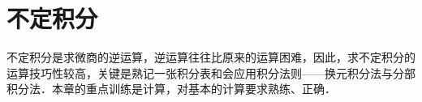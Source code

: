 \chapter{不定积分}\label{chap:06}

不定积分是求微商的逆运算，逆运算往往比原来的运算困难，因此，求不定积分的运算技巧性较高，关键是熟记一张积分表和会应用积分法则——换元积分法与分部积分法．本章的重点训练是计算，对基本的计算要求熟练、正确．



